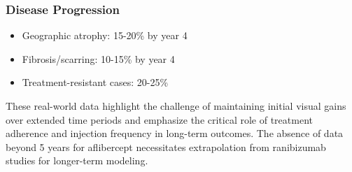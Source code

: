 \subsubsection{Disease Progression}
\begin{itemize}
    \item Geographic atrophy: 15-20\% by year 4
    \item Fibrosis/scarring: 10-15\% by year 4
    \item Treatment-resistant cases: 20-25\%
\end{itemize}

These real-world data highlight the challenge of maintaining initial visual gains over extended time periods and emphasize the critical role of treatment adherence and injection frequency in long-term outcomes. The absence of data beyond 5 years for aflibercept necessitates extrapolation from ranibizumab studies for longer-term modeling.